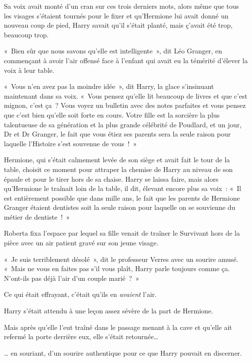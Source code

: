 Sa voix avait monté d'un cran sur ces trois derniers mots, alors même que tous les visages s'étaient tournés pour le fixer et qu'Hermione lui avait donné un nouveau coup de pied, Harry savait qu'il s'était planté, mais ç'avait été trop, beaucoup trop.

«~Bien sûr que nous savons qu'elle est intelligente~», dit Léo Granger, en commençant à avoir l'air offensé face à l'enfant qui avait eu la témérité d'élever la voix à leur table.

«~Vous n'en avez pas la moindre idée~», dit Harry, la glace s'insinuant maintenant dans sa voix.
«~Vous pensez qu'elle lit beaucoup de livres et que c'est mignon, c'est ça~?
Vous voyez un bulletin avec des notes parfaites et vous pensez que c'est bien qu'elle soit forte en cours.
Votre fille est la sorcière la plus talentueuse de sa génération et la plus grande célébrité de Poudlard, et un jour, Dr et Dr Granger, le fait que vous étiez ses parents sera la seule raison pour laquelle l'Histoire s'est souvenue de vous~!~»

Hermione, qui s'était calmement levée de son siège et avait fait le tour de la table, choisit ce moment pour attraper la chemise de Harry au niveau de son épaule et pour le tirer hors de sa chaise.
Harry se laissa faire, mais alors qu'Hermione le traînait loin de la table, il dit, élevant encore plus sa voix~: «~Il est entièrement possible que dans mille ans, le fait que les parents de Hermione Granger étaient dentistes soit la seule raison pour laquelle on se souvienne du métier de dentiste~!~»

\later

Roberta fixa l'espace par lequel sa fille venait de traîner le Survivant hors de la pièce avec un air patient gravé sur son jeune visage.

«~Je suis terriblement désolé~», dit le professeur Verres avec un sourire amusé.
«~Mais ne vous en faites pas s'il vous plaît, Harry parle toujours comme ça.
N'ont-ils pas déjà l'air d'un couple marié~?~»

Ce qui était effrayant, c'était qu'ils en \emph{avaient} l'air.

\later

Harry s'était attendu à une leçon assez sévère de la part de Hermione.

Mais après qu'elle l'eut traîné dans le passage menant à la cave et qu'elle ait refermé la porte derrière eux, elle s'était retournée…

… en souriant, d'un sourire authentique pour ce que Harry pouvait en discerner.

